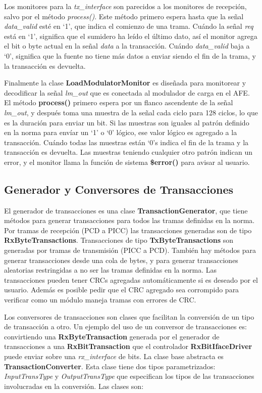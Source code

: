 \documentclass[a4paper, twoside, 11pt]{report}
\begin{document}
Los monitores para la \textit{tx\_interface} son parecidos a los monitores de recepción, salvo por el método \textit{process()}. Este método primero espera hasta que la señal \textit{data\_valid} esté en ‘1’, que indica el comienzo de una trama. Cuándo la señal \textit{req} está en ‘1’, significa que el sumidero ha leído el último dato, así el monitor agrega el bit o byte actual en la señal \textit{data} a la transacción. Cuándo \textit{data\_valid} baja a ‘0’, significa que la fuente no tiene más datos a enviar siendo el fin de la trama, y la transacción es devuelta.

Finalmente la clase \textbf{LoadModulatorMonitor} es diseñada para monitorear y decodificar la señal \textit{lm\_out} que es conectada al modulador de carga en el AFE. El método \textbf{process()} primero espera por un flanco ascendente de la señal \textit{lm\_out}, y después toma una muestra de la señal cada ciclo para 128 ciclos, lo que es la duración para enviar un bit. Si las muestras son iguales al patrón definido en la norma para envíar un ‘1’ o ‘0’ lógico, ese valor lógico es agregado a la transacción. Cuándo todas las muestras están ‘0’s indica el fin de la trama y la transacción es devuelta. Las muestras teniendo cualquier otro patrón indican un error, y el monitor llama la función de sistema \textbf{\$error()} para avisar al usuario.

\FloatBarrier
\subsection{Generador y Conversores de Transacciones}

El generador de transacciones es una clase \textbf{TransactionGenerator}, que tiene métodos para generar transacciones para todos las tramas definidas en la norma. Por tramas de recepción (PCD a PICC) las transacciones generadas son de tipo \textbf{RxByteTransactions}. Transacciones de tipo \textbf{TxByteTransactions} son generadas por tramas de transmisión (PICC a PCD). También hay métodos para generar transacciones desde una cola de bytes, y para generar transacciones aleatorias restringidas a no ser las tramas definidas en la norma. Las transacciones pueden tener CRCs agregadas automáticamente si es deseado por el usuario. Además es posible pedir que el CRC agregado sea corrompido para verificar como un módulo maneja tramas con errores de CRC.

Los conversores de transacciones son clases que facilitan la conversión de un tipo de transacción a otro. Un ejemplo del uso de un conversor de transacciones es: convirtiendo una \textbf{RxByteTransaction} generada por el generador de transacciones a una \textbf{RxBitTransaction} que el controlador \textbf{RxBitIfaceDriver} puede enviar sobre una \textit{rx\_interface} de bits. La clase base abstracta es \textbf{TransactionConverter}. Esta clase tiene dos tipos parametrizados: \textit{InputTransType} y \textit{OutputTransType} que especifican los tipos de las transacciones involucradas en la conversión. Las clases son:
\end{document}
